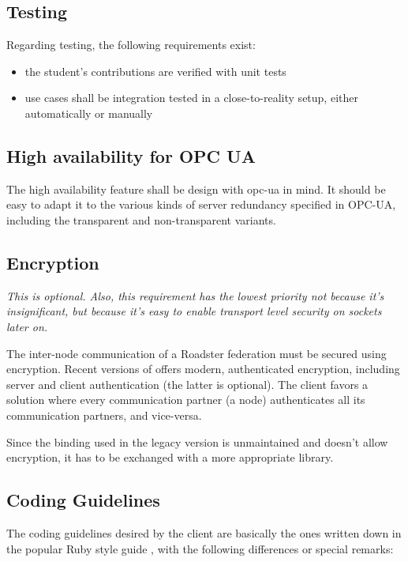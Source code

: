 \subsection{Testing}
Regarding testing, the following requirements exist:
\begin{itemize}
	\item the student's contributions are verified with unit tests
	\item use cases shall be integration tested in a close-to-reality setup, either automatically or manually
\end{itemize}

\subsection{High availability for OPC UA}
The high availability feature shall be design with \gls{opc-ua} in mind. It
should be easy to adapt it to the various kinds of server redundancy specified
in OPC-UA, including the transparent and non-transparent variants.

\subsection{Encryption}
\emph{This is optional. Also, this requirement has the lowest priority not
because it's insignificant, but because it's easy to enable transport level
security on \zmq sockets later on.}

The inter-node communication of a Roadster federation must be secured using
encryption. Recent versions of \zmq offers modern, authenticated encryption,
including server and client authentication (the latter is optional).
The client favors a solution where every communication partner (a node)
authenticates all its communication partners, and vice-versa.

Since the \zmq binding used in the legacy version is unmaintained and doesn't
allow encryption, it has to be exchanged with a more appropriate library.

\subsection{Coding Guidelines}
The coding guidelines desired by the client are basically the ones written down
in the popular Ruby style guide \cite{rb:style-guide}, with the following
differences or special remarks:

